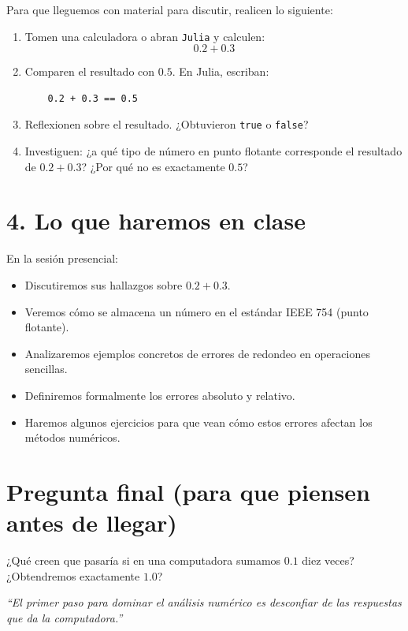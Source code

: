 \documentclass[12pt,letterpaper]{article}
\begin{document}
Para que lleguemos con material para discutir, realicen lo siguiente:

\begin{enumerate}
    \item Tomen una calculadora o abran \texttt{Julia} y calculen:
    \[
    0.2 + 0.3
    \]
    \item Comparen el resultado con $0.5$. En Julia, escriban:
    \begin{verbatim}
    0.2 + 0.3 == 0.5
    \end{verbatim}
    \item Reflexionen sobre el resultado. ¿Obtuvieron \texttt{true} o \texttt{false}?
    \item Investiguen: ¿a qué tipo de número en punto flotante corresponde el resultado de $0.2+0.3$? ¿Por qué no es exactamente $0.5$?
\end{enumerate}

\section*{4. Lo que haremos en clase}

En la sesión presencial:
\begin{itemize}
    \item Discutiremos sus hallazgos sobre $0.2 + 0.3$.
    \item Veremos cómo se almacena un número en el estándar IEEE 754 (punto flotante).
    \item Analizaremos ejemplos concretos de errores de redondeo en operaciones sencillas.
    \item Definiremos formalmente los errores absoluto y relativo.
    \item Haremos algunos ejercicios para que vean cómo estos errores afectan los métodos numéricos.
\end{itemize}

\section*{Pregunta final (para que piensen antes de llegar)}
¿Qué creen que pasaría si en una computadora sumamos $0.1$ diez veces? ¿Obtendremos exactamente $1.0$?

\vspace{1cm}
\textit{“El primer paso para dominar el análisis numérico es desconfiar de las respuestas que da la computadora.”}
\end{document}
